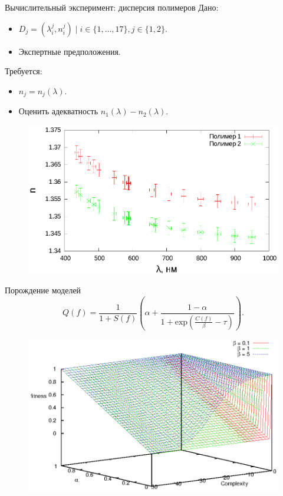 \documentclass{beamer}
\begin{document}
\begin{frame}{Вычислительный эксперимент: дисперсия полимеров}
  Дано:
  \begin{itemize}
    \item $D_j = (\lambda_i^j, n_i^j) \mid i \in \{ 1, \dots, 17 \}, j \in \{ 1, 2 \}.$
    \item Экспертные предположения.
  \end{itemize}
  
  Требуется:
  \begin{itemize}
    \item $n_j = n_j(\lambda).$
    \item Оценить адекватность $n_1 (\lambda) - n_2 (\lambda)$.
  \end{itemize}
  
  \begin{figure}[h]
    \vspace{-20pt}
    \includegraphics[scale=0.6]{figs/polymers.eps}
    \vspace{-30pt}
  \end{figure}
\end{frame}

\begin{frame}{Порождение моделей}
  \[
    Q(f) = \frac{1}{1 + S(f)} \left(\alpha + \frac{1 - \alpha}{1 + \text{exp} (\frac{C(f)}{\beta} - \tau)}\right).
  \]

  \begin{figure}[h]
    \vspace{-20pt}
    \includegraphics[scale=0.8]{figs/fitness.eps}
    \vspace{-30pt}
  \end{figure}
\end{frame}
\end{document}
